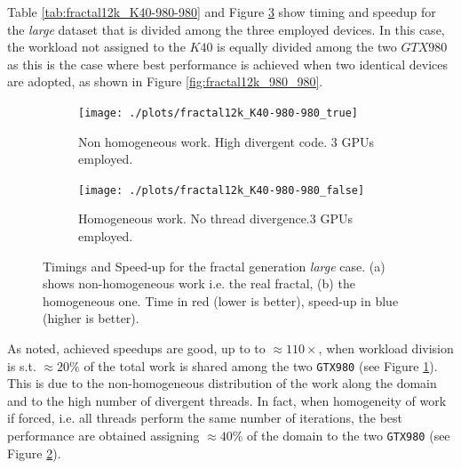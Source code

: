 Table \ref{tab:fractal12k_K40-980-980} and Figure \ref{fig:fractal12k_K40-980-980} show timing and speedup for the \textit{large} dataset that is divided among the three employed devices. In this case, the workload not assigned to the $K40$ is equally divided among the two $GTX980$ as this is the case where best performance is achieved when two identical devices are adopted, as shown in  Figure \ref{fig:fractal12k_980_980}.
\begin{figure}
    \begin{subfigure}{1.0\textwidth}
        \caption{Non homogeneous work. High divergent code. $3$ GPUs employed.}
        \texttt{[image: ./plots/fractal12k\_K40-980-980\_true]}
                \label{fig:fractal12k_K40-980-980_true}
    \end{subfigure}        
    \endminipage \hfill
    \vspace{5mm}
    \begin{subfigure}{1.0\textwidth}
                \texttt{[image: ./plots/fractal12k\_K40-980-980\_false]}
        \caption{Homogeneous work. No thread divergence.$3$ GPUs employed. }
        \label{fig:fractal12k_K40-980-980_false}
    \end{subfigure}
    \endminipage\hfill
\caption[Timings and Speed-up for the fractal generation \textit{large} case.]{Timings and Speed-up for the fractal generation \textit{large} case. (a) shows non-homogeneous work i.e. the real fractal, (b) the homogeneous one. Time in red (lower is better), speed-up in blue (higher is better).}
    \label{fig:fractal12k_K40-980-980}
\end{figure}
As noted, achieved speedups are good, up to to $\approx 110 \times$, when workload division is s.t. $\approx 20\%$ of the total work is shared among the two \texttt{GTX980} (see Figure \ref{fig:fractal12k_K40-980-980_true}). 
This is due to the non-homogeneous distribution of the work along the domain and to the high number of divergent threads. In fact, when homogeneity of work if forced, i.e. all threads perform the same number of iterations, the best performance are obtained assigning $\approx 40\%$  of the domain to the two \texttt{GTX980} (see Figure \ref{fig:fractal12k_K40-980-980_false}).

